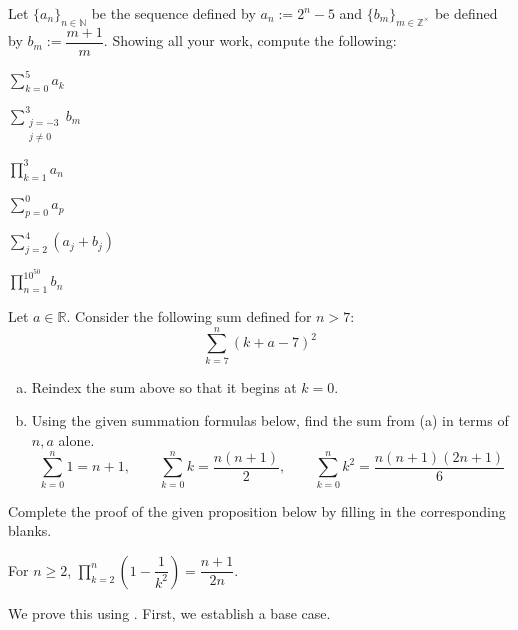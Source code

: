 \documentclass[11pt,letterpaper]{article}
\begin{document}

 Let $\{ a_n \}_{n \in \mathbb{N}}$ be the sequence defined by $a_n:= 2^n - 5$ and $\{ b_m \}_{m \in \mathbb{Z}^\times}$ be defined by $b_m:= \dfrac{m + 1}{m}$. Showing all your work, compute the following:
	\begin{2enumerate}
	\item $\displaystyle \sum_{k= 0}^5 a_k$
	\item $\displaystyle \sum_{\substack{j= -3 \\ j \neq 0}}^3 b_m$
	\item $\displaystyle \prod_{k= 1}^3 a_n$
	\item $\displaystyle \sum_{p=0}^0 a_p$
	\item $\displaystyle \sum_{j=2}^4 (a_j + b_j)$
	\item $\displaystyle \prod_{n=1}^{10^{50}} b_n$
	\end{2enumerate}



\newpage



 Let $a \in \mathbb{R}$. Consider the following sum defined for $n > 7$:
	\[
	\sum_{k=7}^n \left(k + a - 7 \right)^2
	\]

\begin{enumerate}[(a)]
\item Reindex the sum above so that it begins at $k= 0$. 
\item Using the given summation formulas below, find the sum from (a) in terms of $n, a$ alone. 
	\[
	\sum_{k=0}^n 1= n + 1, \qquad \sum_{k=0}^n k= \dfrac{n (n + 1)}{2}, \qquad \sum_{k=0}^n k^2= \dfrac{n (n + 1)(2n + 1)}{6}
	\]
\end{enumerate}



\newpage



 Complete the proof of the given proposition below by filling in the corresponding blanks. \pspace

 For $n \geq 2$, $\displaystyle\prod_{k=2}^n \left(1 - \dfrac{1}{k^2} \right)= \dfrac{n + 1}{2n}$. \pspace

 We prove this using \underline{\hspace{6cm}}. First, we establish a base case. \pspace
\end{document}
